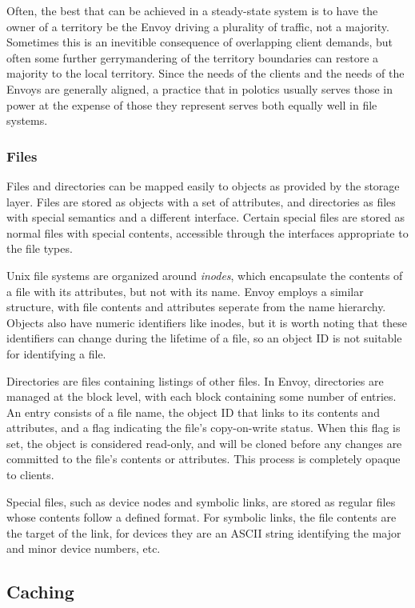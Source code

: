 Often, the best that can be achieved in a steady-state system is to have the owner of a territory be the Envoy driving a plurality of traffic, not a majority. Sometimes this is an inevitible consequence of overlapping client demands, but often some further gerrymandering of the territory boundaries can restore a majority to the local territory. Since the needs of the clients and the needs of the Envoys are generally aligned, a practice that in polotics usually serves those in power at the expense of those they represent serves both equally well in file systems.

\subsubsection{Files}

Files and directories can be mapped easily to objects as provided by the storage layer. Files are stored as objects with a set of attributes, and directories as files with special semantics and a different interface. Certain special files are stored as normal files with special contents, accessible through the interfaces appropriate to the file types.

Unix file systems are organized around \emph{inodes}, which encapsulate the contents of a file with its attributes, but not with its name. Envoy employs a similar structure, with file contents and attributes seperate from the name hierarchy. Objects also have numeric identifiers like inodes, but it is worth noting that these identifiers can change during the lifetime of a file, so an object ID is not suitable for identifying a file.

Directories are files containing listings of other files. In Envoy, directories are managed at the block level, with each block containing some number of entries. An entry consists of a file name, the object ID that links to its contents and attributes, and a flag indicating the file's copy-on-write status. When this flag is set, the object is considered read-only, and will be cloned before any changes are committed to the file's contents or attributes. This process is completely opaque to clients.

Special files, such as device nodes and symbolic links, are stored as regular files whose contents follow a defined format. For symbolic links, the file contents are the target of the link, for devices they are an ASCII string identifying the major and minor device numbers, etc. 

\subsection{Caching}



